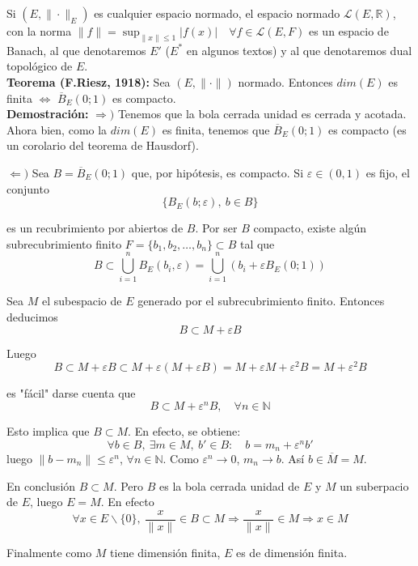 \documentclass{article}
\begin{document}
\begin{itemize}
Si $(E,\|\cdot\|_E)$ es cualquier espacio normado, el espacio normado $\mathcal{L}(E,\mathbb{R})$, con la norma $\|f\|=\sup_{\|x\|\leq 1}|f(x)|\quad \forall f\in \mathcal{L}(E,F)$ es un espacio de Banach, al que denotaremos $E'$ ($E^*$ en algunos textos) y al que denotaremos dual topológico de $E$.\\

\textbf{Teorema (F.Riesz, 1918):} Sea $(E,\|\cdot\|)$ normado. Entonces $dim(E)$ es finita $\Leftrightarrow$ $\overline{B}_E(0;1)$ es compacto.\\

\textbf{Demostración:} $\Rightarrow)$ Tenemos que la bola cerrada unidad es cerrada y acotada. Ahora bien, como la $dim(E)$ es finita, tenemos que $\overline{B}_E(0;1)$ es compacto (es un corolario del teorema de Hausdorf).

$\Leftarrow)$ Sea $B=\overline{B}_E(0;1)$ que, por hipótesis, es compacto.  Si $\varepsilon \in (0,1)$ es fijo, el conjunto
\begin{equation*}
\{B_E(b;\varepsilon),\:b\in B\}
\end{equation*} 

es un recubrimiento por abiertos de $B$. Por ser $B$ compacto, existe algún subrecubrimiento finito $F=\{b_1,b_2,\ldots,b_n\}\subset B$ tal que
\begin{equation*}
B\subset \bigcup_{i=1}^n B_E(b_i,\varepsilon)=\bigcup_{i=1}^n(b_i+\varepsilon B_E(0;1))
\end{equation*}

Sea $M$ el subespacio de $E$ generado por el subrecubrimiento finito. Entonces deducimos
\begin{equation*}
B\subset M+\varepsilon B
\end{equation*}

Luego
\begin{equation*}
B\subset M+\varepsilon B\subset M+\varepsilon(M+\varepsilon B)=M+\varepsilon M+\varepsilon^2 B=M+\varepsilon^2 B
\end{equation*}

es "fácil" darse cuenta que
\begin{equation*}
B\subset M+\varepsilon^n B,\quad \forall n\in\mathbb{N}
\end{equation*}

Esto implica que $B\subset M$. En efecto, se obtiene:
\begin{equation*}
\forall b\in B,\:\exists m\in M,\:b'\in B:\quad b=m_n+\varepsilon^nb'
\end{equation*}
luego $\|b-m_n\|\leq \varepsilon^n$, $\forall n\in \mathbb{N}$. Como $\varepsilon^n\to 0$, $m_n\to b$. Así $b\in \overline{M}=M$.

En conclusión $B\subset M$. Pero $B$ es la bola cerrada unidad de $E$ y $M$ un suberpacio de $E$, luego $E=M$. En efecto
\begin{equation*}
\forall x\in E\backslash\{0\},\:\frac{x}{\|x\|}\in B\subset M\Rightarrow \frac{x}{\|x\|}\in M\Rightarrow x\in M
\end{equation*}

Finalmente como $M$ tiene dimensión finita, $E$ es de dimensión finita.
\end{itemize}
\end{document}

